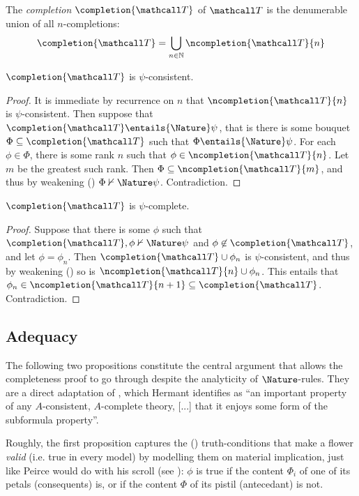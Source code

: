 \begin{definition}[Completion]
  The \emph{completion} $\completion{\tT}$ of $\tT$ is the denumerable union of all
  $n$-completions:
  $$\completion{\tT} = \bigcup_{n \in \nats}{\ncompletion{\tT}{n}}$$
\end{definition}

\begin{lemma}
  $\completion{\tT}$ is $\psi$-consistent.
\end{lemma}
\begin{proof}
  It is immediate by recurrence on $n$ that $\ncompletion{\tT}{n}$ is
  $\psi$-consistent. Then suppose that $\completion{\tT} \entails{\Nature} \psi$,
  that is there is some bouquet $\Phi \subseteq \completion{\tT}$ such that $\Phi
  \entails{\Nature} \psi$. For each $\phi \in \Phi$, there is some rank $n$ such
  that $\phi \in \ncompletion{\tT}{n}$. Let $m$ be the greatest such rank. Then
  $\Phi \subseteq \ncompletion{\tT}{m}$, and thus by weakening
  () $\Phi \nvdash{\Nature} \psi$. Contradiction.
\end{proof}


\begin{lemma}
  $\completion{\tT}$ is $\psi$-complete.
\end{lemma}
\begin{proof}
  Suppose that there is some $\phi$ such that $\completion{\tT}, \phi
  \nvdash{\Nature} \psi$ and $\phi \not\in \completion{\tT}$, and let $\phi =
  \phi_n$. Then $\completion{\tT} \cup \phi_n$ is $\psi$-consistent, and thus by
  weakening () so is $\ncompletion{\tT}{n} \cup \phi_n$. This
  entails that $\phi_n \in \ncompletion{\tT}{n+1} \subseteq \completion{\tT}$.
  Contradiction.
\end{proof}

\subsection{Adequacy}

The following two propositions constitute the central argument that allows the
completeness proof to go through despite the analyticity of $\Nature$-rules.
They are a direct adaptation of \cite[Proposition 7]{hutchison_semantic_2005},
which Hermant identifies as ``an important property of any $A$-consistent,
$A$-complete theory, [...] that it enjoys some form of the subformula
property''.

Roughly, the first proposition captures the () truth-conditions
that make a flower \emph{valid} (i.e. true in every model) by modelling them on
material implication, just like Peirce would do with his scroll (see
): $\phi$ is true if the content $\Phi_i$ of one of its petals
(consequents) is, or if the content $\Phi$ of its pistil (antecedant) is not.

